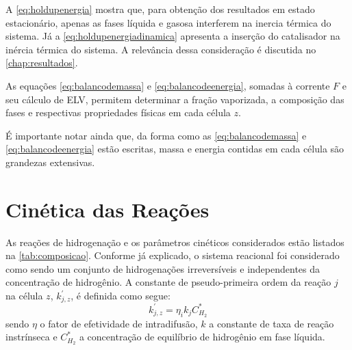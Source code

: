 A \autoref{eq:holdupenergia} mostra que, para obtenção dos resultados em estado
estacionário, apenas as fases líquida e gasosa interferem na inercia térmica do
sistema. Já a \autoref{eq:holdupenergiadinamica} apresenta a inserção do
catalisador na inércia térmica do sistema. A relevância dessa consideração é
discutida no \autoref{chap:resultados}.


As equações \ref{eq:balancodemassa} e \ref{eq:balancodeenergia}, somadas
à corrente $F$ e seu cálculo de ELV, permitem determinar a fração vaporizada,
a composição das fases e respectivas propriedades físicas em cada célula $z$.

É importante notar ainda que, da forma como as \autoref{eq:balancodemassa} e
\autoref{eq:balancodeenergia} estão escritas, massa e energia contidas em cada
célula são grandezas extensivas. 

\section{Cinética das Reações} \label{sec:cineticadasreacoes}

As reações de hidrogenação e os parâmetros cinéticos considerados estão
listados na \autoref{tab:composicao}. Conforme já explicado, o sistema reacional
foi considerado como sendo um conjunto de hidrogenações irreversíveis e
independentes da concentração de hidrogênio. A constante de pseudo-primeira
ordem da reação $j$ na célula $z$, $k^{'}_{j,z}$, é definida como segue:
\begin{equation}
k^{'}_{j,z} = \eta_ik_jC^{*}_{H_2}
\label{eq:constantepseudoprimeiraordem}
\end{equation}
sendo $\eta$ o fator de efetividade de intradifusão, $k$ a
constante de taxa de reação instrínseca e $C^{*}_{H_2}$ a concentração de
equilíbrio de hidrogênio em fase líquida.


